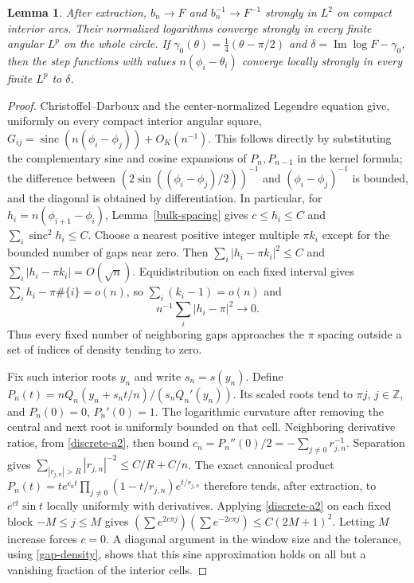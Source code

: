 \documentclass[a4paper,11pt]{amsart}
\newtheorem{lemma}[theorem]{Lemma}
\theoremstyle{remark}\newtheorem{remark}[theorem]{Remark}
\begin{document}
\begin{lemma}\label{boundary-compactness}
After extraction, $b_n\to F$ and $b_n^{-1}\to F^{-1}$ strongly in
$L^2$ on compact interior arcs. Their normalized logarithms converge
strongly in every finite angular $L^p$ on the whole circle.
If $\gamma_0(\theta)=\tfrac14(\theta-\pi/2)$ and
$\delta=\operatorname{Im}\log F-\gamma_0$, then the step functions
with values $n(\phi_i-\theta_i)$ converge locally strongly in every
finite $L^p$ to $\delta$.
\end{lemma}

\begin{proof}
Christoffel--Darboux and the center-normalized Legendre equation give,
uniformly on every compact interior angular square,
$G_{ij}=\operatorname{sinc}(n(\phi_i-\phi_j))+O_K(n^{-1})$.
This follows directly by substituting the complementary sine and
cosine expansions of $P_n,P_{n-1}$ in the kernel formula; the
difference between $(2\sin((\phi_i-\phi_j)/2))^{-1}$ and
$(\phi_i-\phi_j)^{-1}$ is bounded, and the diagonal is obtained by
differentiation. In particular, for $h_i=n(\phi_{i+1}-\phi_i)$,
Lemma~\ref{bulk-spacing} gives $c\le h_i\le C$ and
$\sum_i\operatorname{sinc}^2h_i\le C$.
Choose a nearest positive integer multiple $\pi k_i$ except for
the bounded number of gaps near zero. Then
$\sum_i|h_i-\pi k_i|^2\le C$ and
$\sum_i|h_i-\pi k_i|=O(\sqrt n)$.
Equidistribution on each fixed interval gives
$\sum_i h_i-\pi\#\{i\}=o(n)$, so
$\sum_i(k_i-1)=o(n)$ and
\begin{equation}\label{gap-density}
 n^{-1}\sum_i|h_i-\pi|^2\longrightarrow0.
\end{equation}
Thus every fixed number of neighboring gaps approaches the $\pi$
spacing outside a set of indices of density tending to zero.

Fix such interior roots $y_n$ and write $s_n=s(y_n)$.
Define $P_n(t)=nQ_n(y_n+s_nt/n)/(s_nQ_n'(y_n))$.
Its scaled roots tend to $\pi j$, $j\in\mathbb Z$, and
$P_n(0)=0$, $P_n'(0)=1$.
The logarithmic curvature after removing the central and next root
is uniformly bounded on that cell. Neighboring derivative ratios,
from \eqref{discrete-a2}, then bound
$c_n=P_n''(0)/2=-\sum_{j\ne0}r_{j,n}^{-1}$.
Separation gives
$\sum_{|r_{j,n}|>R}|r_{j,n}|^{-2}\le C/R+C/n$.
The exact canonical product
$P_n(t)=t e^{c_nt}\prod_{j\ne0}(1-t/r_{j,n})e^{t/r_{j,n}}$
therefore tends, after extraction, to $e^{ct}\sin t$ locally
uniformly with derivatives. Applying \eqref{discrete-a2} on each
fixed block $-M\le j\le M$ gives
$(\sum e^{2c\pi j})(\sum e^{-2c\pi j})\le C(2M+1)^2$.
Letting $M$ increase forces $c=0$.
A diagonal argument in the window size and the tolerance, using
\eqref{gap-density}, shows that this sine approximation holds on
all but a vanishing fraction of the interior cells.


\end{proof}
\end{document}
